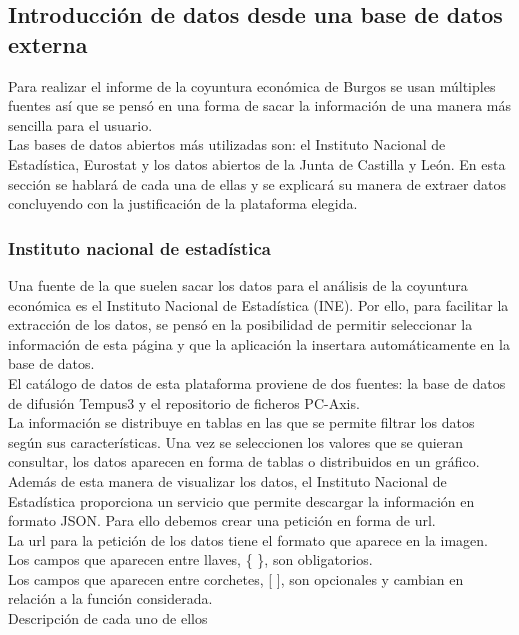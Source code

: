\subsection{Introducción de datos desde una base de datos externa}
Para realizar el informe de la coyuntura económica de Burgos se usan múltiples fuentes así que se pensó en una forma de sacar la información de una manera más sencilla para el usuario.\\
Las bases de datos abiertos más utilizadas son: el Instituto Nacional de Estadística, Eurostat y los datos abiertos de la Junta de Castilla y León. En esta sección se hablará de cada una de ellas y se explicará su manera de extraer datos concluyendo con la justificación de la plataforma elegida.
\subsubsection{Instituto nacional de estadística}
Una fuente de la que suelen sacar los datos para el análisis de la coyuntura económica es el Instituto Nacional de Estadística (INE). Por ello, para facilitar la extracción de los datos, se pensó en la posibilidad de permitir seleccionar la información de esta página y que la aplicación la insertara automáticamente en la base de datos.\\
El catálogo de datos de esta plataforma proviene de dos fuentes: la base de datos de difusión Tempus3 y el repositorio de ficheros PC-Axis.\\
La información se distribuye en tablas en las que se permite filtrar los datos según sus características.
Una vez se seleccionen los valores que se quieran consultar, los datos aparecen en forma de tablas o distribuidos en un gráfico.
Además de esta manera de visualizar los datos, el Instituto Nacional de Estadística proporciona un servicio que permite descargar la información en formato JSON. Para ello debemos crear una petición en forma de url.\\
 La url para la petición de los datos tiene el formato que aparece en la imagen. 
Los campos que aparecen entre llaves, \{ \}, son obligatorios.\cite{ine:urljson}\\
Los campos que aparecen entre corchetes, [ ], son opcionales y cambian en relación a la función considerada.\\
Descripción de cada uno de ellos
